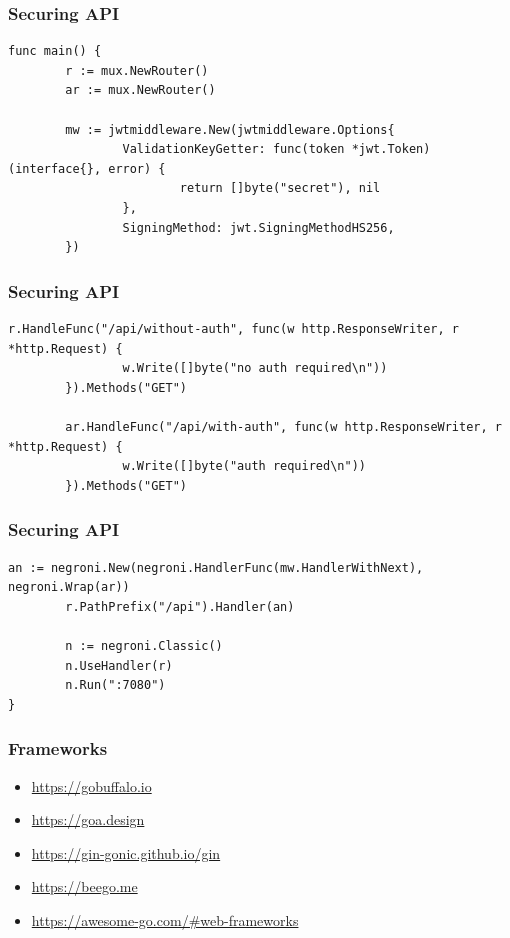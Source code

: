 \documentclass[aspectratio=169]{beamer}
\begin{document}
\begin{frame}[fragile]
  \frametitle{Securing API}

  \begin{Verbatim}[fontsize=\tiny]
func main() {
        r := mux.NewRouter()
        ar := mux.NewRouter()

        mw := jwtmiddleware.New(jwtmiddleware.Options{
                ValidationKeyGetter: func(token *jwt.Token) (interface{}, error) {
                        return []byte("secret"), nil
                },
                SigningMethod: jwt.SigningMethodHS256,
        })    
  \end{Verbatim}

\end{frame}

\begin{frame}[fragile]
  \frametitle{Securing API}

  \begin{Verbatim}[fontsize=\tiny]
        r.HandleFunc("/api/without-auth", func(w http.ResponseWriter, r *http.Request) {
                w.Write([]byte("no auth required\n"))
        }).Methods("GET")

        ar.HandleFunc("/api/with-auth", func(w http.ResponseWriter, r *http.Request) {
                w.Write([]byte("auth required\n"))
        }).Methods("GET")    
  \end{Verbatim}

\end{frame}

\begin{frame}[fragile]
  \frametitle{Securing API}

  \begin{Verbatim}[fontsize=\tiny]
        an := negroni.New(negroni.HandlerFunc(mw.HandlerWithNext), negroni.Wrap(ar))
        r.PathPrefix("/api").Handler(an)

        n := negroni.Classic()
        n.UseHandler(r)
        n.Run(":7080")
}    
  \end{Verbatim}

\end{frame}


\begin{frame}[fragile]
  \frametitle{Frameworks}

  \begin{itemize}
  \item \url{https://gobuffalo.io}
  \item \url{https://goa.design}
  \item \url{https://gin-gonic.github.io/gin}
  \item \url{https://beego.me}
  \item \url{https://awesome-go.com/#web-frameworks}
  \end{itemize}

\end{frame}
\end{document}
